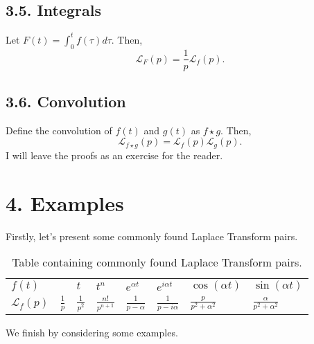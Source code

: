 \documentclass[11pt]{article}
\begin{document}
\subsection*{3.5. Integrals}
Let $F(t) = \int_{0}^{t} f(\tau) d\tau$. Then,
\begin{equation}
    \mathcal{L}_{F} (p) = \frac{1}{p} \mathcal{L}_f(p).
\end{equation}

\subsection*{3.6. Convolution}
Define the convolution of $f(t)$ and $g(t)$ as $f \star g$. Then,
\begin{equation}
    \mathcal{L}_{f \star g} (p) = \mathcal{L}_{f} (p) \mathcal{L}_{g} (p).
\end{equation}
I will leave the proofs as an exercise for the reader.

\newpage

\section*{4. Examples}
Firstly, let's present some commonly found Laplace Transform pairs.
\begin{table}[h]
\begin{center}
    \begin{tabularx}{0.9\textwidth}{
    >{\centering\arraybackslash}X
    >{\centering\arraybackslash}X
    >{\centering\arraybackslash}X
    >{\centering\arraybackslash}X
    >{\centering\arraybackslash}X
    >{\centering\arraybackslash}X
    >{\centering\arraybackslash}X
    >{\centering\arraybackslash}X}
    \hline
    \multicolumn{8}{c}{\textbf{Laplace Transform Pairs}} \\[4pt]
    \hline 
    $f(t)$  & 1 & $t$ & $t^n$ & $e^{\alpha t}$ & $e^{i \alpha t}$ & $\cos(\alpha t) $& $\sin(\alpha t)$ \\[4pt]
    \hline 
    $\mathcal{L}_f (p)$ & $\frac{1}{p}$ & $\frac{1}{p^2}$ & $\frac{n!}{p^{n+1}}$ & $\frac{1}{p-\alpha}$ & $\frac{1}{p-i\alpha}$ & $\frac{p}{p^2 + \alpha^2}$ & $\frac{\alpha}{p^2 + \alpha^2}$ \\[4pt]
    \hline
    \end{tabularx}
\end{center}
\caption{Table containing commonly found Laplace Transform pairs.}
\end{table}


\vspace{0.4cm}
We finish by considering some examples.
\end{document}
